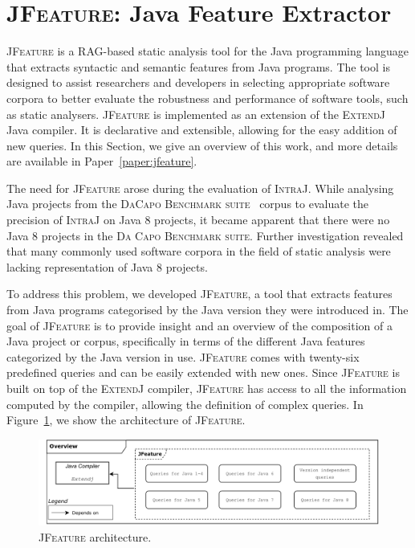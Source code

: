 \section{\textsc{JFeature}: Java Feature Extractor}
\label{sec:JFeature}
\textsc{JFeature} is a RAG-based static analysis tool for the Java programming language that extracts
syntactic and semantic features from Java programs. The tool is designed to assist
researchers and developers in selecting appropriate software corpora to better evaluate the robustness
and performance of software tools, such as static analysers.
\textsc{JFeature} is implemented as an extension of the \textsc{ExtendJ} Java compiler. It is declarative
and extensible, allowing for the easy addition of new queries. In this Section, 
we give an overview of this work, and more details are available in Paper~\ref{paper:jfeature}.

The need for \textsc{JFeature} arose during the evaluation of \textsc{IntraJ}.
While analysing Java projects from the \textsc{DaCapo Benchmark suite}~\cite{DaCapo:paper} corpus to evaluate the precision
of \textsc{IntraJ} on Java 8 projects, it became apparent that there were no Java 8 projects
in the \textsc{Da Capo Benchmark suite}. Further investigation revealed that many
commonly used software corpora in the field of static analysis were lacking
representation of Java 8 projects.

To address this problem, we developed \textsc{JFeature}, a tool that extracts features from
Java programs categorised by the Java version they were introduced in.
The goal of \textsc{JFeature} is to provide insight and an overview of
the composition of a Java project or corpus, specifically in terms of the different
Java features categorized by the Java version in use.
\textsc{JFeature} comes with twenty-six predefined queries and can be easily extended
with new ones. Since \textsc{JFeature} is built on top of the \textsc{ExtendJ} compiler, \textsc{JFeature} has access
to all the information computed by the compiler, allowing the definition of complex
queries.
In Figure~\ref{fig:JFeature}, we show the architecture of \textsc{JFeature}.
\begin{figure}[H]
  \centering
  \includegraphics[width=1\textwidth]{kappa/img/JFeature.pdf}
  \caption{\label{fig:JFeature} \textsc{JFeature} architecture.}
\end{figure}

